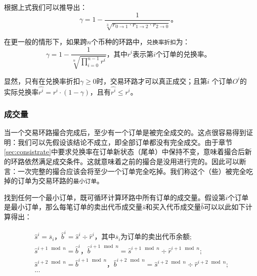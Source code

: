 \documentclass[UTF8,nofonts]{ctexart}
\begin{document}
根据上式我们可以推导出：
\begin{equation*}
\gamma = 1- \frac{1}{\sqrt[3]{r_{0\rightarrow 1} \cdot r_{1\rightarrow 2} \cdot r_{2\rightarrow 0}}}\text{。}
\end{equation*}

在更一般的情形下，如果跨$n$个币种的环路中，\texttt{兑换率折扣}为：
\begin{equation*}
\gamma = 1- \frac{1}{\sqrt[n]{\prod_{i=0}^{n-1} r^i}} \text{，其中} r^i \text{表示第}i\text{个订单的兑换率。}
\end{equation*}

显然，只有在兑换率折扣$\gamma \ge 0$时，交易环路才可以真正成交；且第$i$ 个订单$O^i$的实际兑换率$\hat{r^i} = r^i \cdot (1-\gamma)$，且有$\hat{r^i}\le r^i$。



\subsubsection{成交量\label{sec:matchquantity}}

当一个交易环路撮合完成后，至少有一个订单是被完全成交的。这点很容易得到证明：我们可以先假设该结论不成立，即全部订单都没有完全成交。由于章节\ref{sec:consistrate}中要求兑换率在订单新状态（尾单）中保持不变，意味着撮合后新的环路依然满足成交条件。这就意味着之前的撮合是没用进行完的。因此可以断言：一次完整的撮合应该会将至少一个订单完全吃掉。我们称这个（些）被完全吃掉的订单为交易环路的\texttt{最小订单}。

找到任何一个最小订单，既可循环计算环路中所有订单的成交量。假设第$i$个订单是最小订单，那么每笔订单的卖出代币成交量$\hat{s}$和买入代币成交量$\hat{b}$可以以此如下计算得出：

\[
\begin{split}
&\hat{s}^{i}=\overline{s}_i\text{，} \hat{b}^{i}=\hat{s}^{i}\div \hat{r}^i \text{，其中}\overline{s}_i\text{为订单的卖出代币余额;}\\
&\hat{s}^{i+1\mod n}=\hat{b}^i\text{，} \hat{b}^{i+1\mod n}=\hat{s}^{i+1\mod n}\div \hat{r}^{i+1\mod n}\text{;}\\
&\hat{s}^{i+2\mod n}=\hat{b}^{i+1\mod n}\text{，} \hat{b}^{i+2\mod n}=\hat{s}^{i+2\mod n}\div \hat{r}^{i+2\mod n}\text{;}\\
& ...
\end{split}
\]
\end{document}
